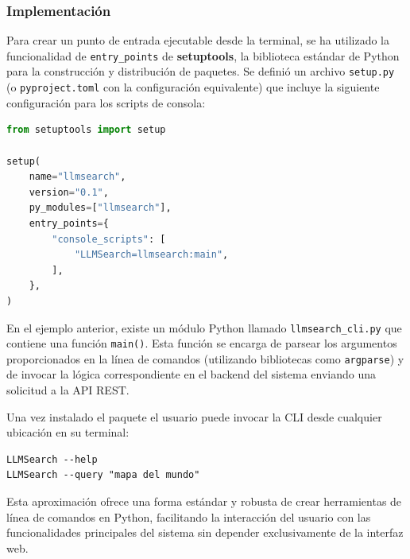 \subsubsection{Implementación}
Para crear un punto de entrada ejecutable desde la terminal, se ha utilizado la funcionalidad de \texttt{entry\_points} de \textbf{setuptools}, la biblioteca estándar de Python para la construcción y distribución de paquetes. Se definió un archivo \texttt{setup.py} (o \texttt{pyproject.toml} con la configuración equivalente) que incluye la siguiente configuración para los scripts de consola:

\begin{lstlisting}[language=Python, caption={Definición del punto de entrada en setup.py}, label=lst:setup_py_cli, basicstyle=\footnotesize\ttfamily, breaklines=true]
from setuptools import setup

setup(
    name="llmsearch",
    version="0.1",
    py_modules=["llmsearch"],
    entry_points={
        "console_scripts": [
            "LLMSearch=llmsearch:main",
        ],
    },
)
\end{lstlisting}
En el ejemplo anterior, existe un módulo Python llamado \texttt{llmsearch\_cli.py} que contiene una función \texttt{main()}. Esta función se encarga de parsear los argumentos proporcionados en la línea de comandos (utilizando bibliotecas como \texttt{argparse}) y de invocar la lógica correspondiente en el backend del sistema enviando una solicitud a la API REST.

Una vez instalado el paquete el usuario puede invocar la CLI desde cualquier ubicación en su terminal:
\begin{verbatim}
LLMSearch --help
LLMSearch --query "mapa del mundo"
\end{verbatim}
Esta aproximación ofrece una forma estándar y robusta de crear herramientas de línea de comandos en Python, facilitando la interacción del usuario con las funcionalidades principales del sistema sin depender exclusivamente de la interfaz web.